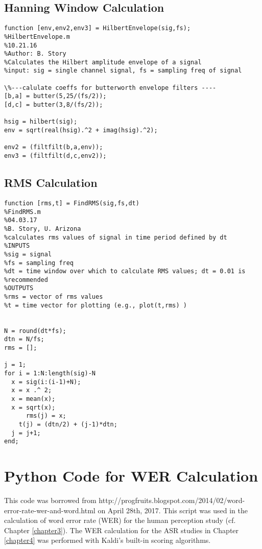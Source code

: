 \subsection{Hanning Window Calculation}

\begin{verbatim}
function [env,env2,env3] = HilbertEnvelope(sig,fs);
%HilbertEnvelope.m
%10.21.16
%Author: B. Story
%Calculates the Hilbert amplitude envelope of a signal
%input: sig = single channel signal, fs = sampling freq of signal

\%---calulate coeffs for butterworth envelope filters ----
[b,a] = butter(5,25/(fs/2));
[d,c] = butter(3,8/(fs/2));

hsig = hilbert(sig);
env = sqrt(real(hsig).^2 + imag(hsig).^2);

env2 = (filtfilt(b,a,env));
env3 = (filtfilt(d,c,env2));
\end{verbatim}


\subsection{RMS Calculation}

\begin{verbatim}
function [rms,t] = FindRMS(sig,fs,dt)
%FindRMS.m
%04.03.17
%B. Story, U. Arizona
%calculates rms values of signal in time period defined by dt
%INPUTS
%sig = signal
%fs = sampling freq
%dt = time window over which to calculate RMS values; dt = 0.01 is
%recommended
%OUTPUTS
%rms = vector of rms values
%t = time vector for plotting (e.g., plot(t,rms) )


N = round(dt*fs);
dtn = N/fs;
rms = [];

j = 1;
for i = 1:N:length(sig)-N
  x = sig(i:(i-1)+N);
  x = x .^ 2;
  x = mean(x);
  x = sqrt(x);
      rms(j) = x;
    t(j) = (dtn/2) + (j-1)*dtn;
  j = j+1;
end;
\end{verbatim}


\section{Python Code for WER Calculation}\label{python-code}

This code was borrowed from http://progfruits.blogspot.com/2014/02/word-error-rate-wer-and-word.html on April 28th, 2017.  This script was used in the calculation of word error rate (WER) for the human perception study (cf. Chapter \ref{chapter3}).  The WER calculation for the ASR studies in Chapter \ref{chapter4} was performed with Kaldi's built-in scoring algorithms.

